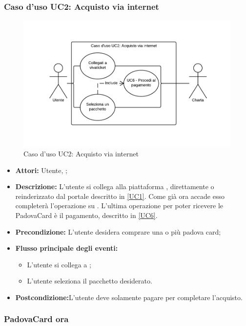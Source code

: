 \subsubsection{Caso d'uso UC2: Acquisto via internet}
\begin{figure}[H]
\centering
\includegraphics[width=1\textwidth]{images/UC2.png}
\caption{Caso d'uso UC2: Acquisto via internet}
\end{figure}
\begin{itemize}
\item \textbf{Attori:} Utente, \charta;
\item \textbf{Descrizione:} L'utente si collega alla piattaforma \vivaticket, direttamente o reinderizzato dal portale descritto in \ref{UC1}. Come già ora accade esso completerà l'operazione su \vivaticket. L'ultima operazione per poter ricevere le PadovaCard è il pagamento, descritto in \ref{UC6}.
\item \textbf{Precondizione:} L'utente desidera comprare una o più padova card;
\item \textbf{Flusso principale degli eventi:}
	\begin{itemize}
		\item L'utente si collega a \vivaticket;
		\item L'utente seleziona il pacchetto desiderato.
	\end{itemize}
\item \textbf{Postcondizione:}L'utente deve solamente pagare per completare l'acquisto.
\end{itemize}\subsubsection{PadovaCard ora}

